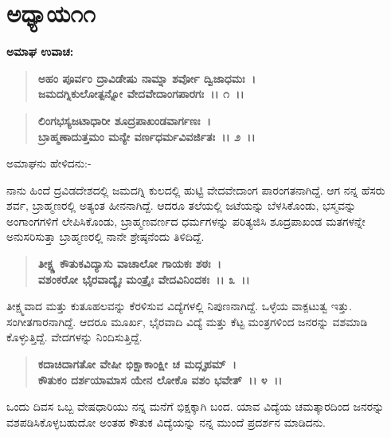 \newpage

\section*{ಅಧ್ಯಾಯ\enginline{-}೧೧}

\begin{flushleft}
\textbf{ಅಮಾಘ ಉವಾಚ:\enginline{-} }
\end{flushleft}

\begin{verse}
\textbf{ಅಹಂ ಪೂರ್ವಂ ದ್ರಾವಿಡೇಷು ನಾಮ್ನಾ ಶರ್ವೋ ದ್ವಿಜಾಧಮಃ~।}\\\textbf{ಜಮದಗ್ನಿಕುಲೋತ್ಪನ್ನೋ ವೇದವೇದಾಂಗಪಾರಗಃ~।। ೧~।।} 
\end{verse}

\begin{verse}
\textbf{ಲಿಂಗಭಸ್ಯಜಟಾಧಾರೀ ಶೂದ್ರಪಾಖಂಡವಾರ್ಗಣಃ~।}\\\textbf{ಬ್ರಾಹ್ಮಣಾದುತ್ತಮಂ ಮನ್ಯೇ ವರ್ಣಧರ್ಮವಿವರ್ಜಿತಃ~।। ೨~।।}
\end{verse}

\begin{flushleft}
ಅಮಾಘನು ಹೇಳಿದನು:-
\end{flushleft}

ನಾನು ಹಿಂದೆ ದ್ರವಿಡದೇಶದಲ್ಲಿ ಜಮದಗ್ನಿ ಕುಲದಲ್ಲಿ ಹುಟ್ಟಿ ವೇದವೇದಾಂಗ ಪಾರಂಗತನಾಗಿದ್ದೆ. ಆಗ ನನ್ನ ಹೆಸರು ಶರ್ವ, ಬ್ರಾಹ್ಮಣರಲ್ಲಿ ಅತ್ಯಂತ ಹೀನನಾಗಿದ್ದೆ. ಆದರೂ ತಲೆಯಲ್ಲಿ ಜಟೆಯನ್ನು ಬೆಳಸಿಕೊಂಡು, ಭಸ್ಮವನ್ನು ಅಂಗಾಂಗಗಳಿಗೆ ಲೇಪಿಸಿಕೊಂಡು, ಬ್ರಾಹ್ಮಣವರ್ಣದ ಧರ್ಮಗಳನ್ನು ಪರಿತ್ಯಜಿಸಿ ಶೂದ್ರಪಾಖಂಡ ಮತಗಳನ್ನೇ ಅನುಸರಿಸುತ್ತಾ ಬ್ರಾಹ್ಮಣರಲ್ಲಿ ನಾನೇ ಶ್ರೇಷ್ಠನೆಂದು ತಿಳಿದಿದ್ದೆ.

\begin{verse}
\textbf{ತೀಕ್ಷ್ಣ ಕೌತುಕವಿದ್ಯಾಸು ವಾಚಾಲೋ ಗಾಯಕಃ ಶಠಃ~।}\\\textbf{ವಶಂಕರೋ ಭೈರವಾದ್ಯೈಃ ಮಂತ್ರೈಃ ವೇದವಿನಿಂದಕಃ~।। ೩~।।}
\end{verse}

ತೀಕ್ಷ್ಮವಾದ ಮತ್ತು ಕುತೂಹಲವನ್ನು ಕೆರಳಿಸುವ ವಿದ್ಯೆಗಳಲ್ಲಿ ನಿಪುಣನಾಗಿದ್ದೆ. ಒಳ್ಳೆಯ ವಾಕ್ಪಟುತ್ವ ಇತ್ತು. ಸಂಗೀತಗಾರನಾಗಿದ್ದೆ. ಆದರೂ ಮೂರ್ಖ, ಭೈರವಾದಿ ವಿದ್ಯೆ ಮತ್ತು ಕೆಟ್ಟ ಮಂತ್ರಗಳಿಂದ ಜನರನ್ನು ವಶಮಾಡಿ ಕೊಳ್ಳುತ್ತಿದ್ದೆ. ವೇದಗಳನ್ನು ನಿಂದಿಸುತ್ತಿದ್ದೆ.

\begin{verse}
\textbf{ಕದಾಚಿದಾಗತೋ ವೇಷೀ ಭಿಕ್ಷಾಕಾಂಕ್ಷೀ ಚ ಮದ್ಗೃಹಮ್~।}\\\textbf{ಕೌತುಕಂ ದರ್ಶಯಾಮಾಸ ಯೇನ ಲೋಕೊ ವಶಂ ಭವೇತ್~।। ೪~।।}
\end{verse}

ಒಂದು ದಿವಸ ಒಬ್ಬ ವೇಷಧಾರಿಯು ನನ್ನ ಮನೆಗೆ ಭಿಕ್ಷಕ್ಕಾಗಿ ಬಂದ. ಯಾವ ವಿದ್ಯೆಯ ಚಮತ್ಕಾರದಿಂದ ಜನರನ್ನು ವಶಪಡಿಸಿಕೊಳ್ಳಬಹುದೋ ಅಂತಹ ಕೌತುಕ ವಿದ್ಯೆಯನ್ನು ನನ್ನ ಮುಂದೆ ಪ್ರದರ್ಶನ ಮಾಡಿದನು.

